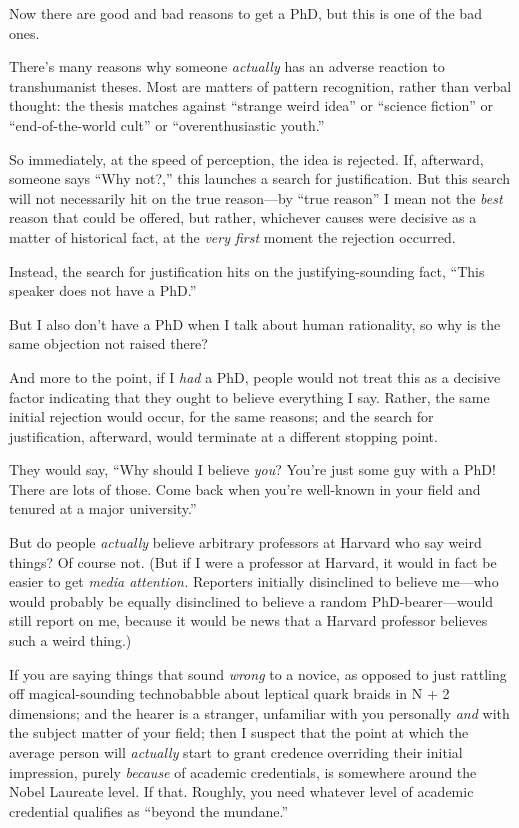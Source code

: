 {
 Now there are good and bad reasons to get a PhD, but this is one
of the bad ones.}

{
 There's many reasons why someone \textit{actually}
has an adverse reaction to transhumanist theses. Most are matters of
pattern recognition, rather than verbal thought: the thesis matches
against ``strange weird idea'' or
``science fiction'' or
``end-of-the-world cult'' or
``overenthusiastic youth.''}

{
 So immediately, at the speed of perception, the idea is rejected.
If, afterward, someone says ``Why
not?,'' this launches a search for justification. But
this search will not necessarily hit on the true reason---by
``true reason'' I mean not the
\textit{best} reason that could be offered, but rather, whichever
causes were decisive as a matter of historical fact, at the
\textit{very first} moment the rejection occurred.}

{
 Instead, the search for justification hits on the
justifying-sounding fact, ``This speaker does not have
a PhD.''}

{
 But I also don't have a PhD when I talk about
human rationality, so why is the same objection not raised there?}

{
 And more to the point, if I \textit{had} a PhD, people would not
treat this as a decisive factor indicating that they ought to believe
everything I say. Rather, the same initial rejection would occur, for
the same reasons; and the search for justification, afterward, would
terminate at a different stopping point.}

{
 They would say, ``Why should I believe
\textit{you}? You're just some guy with a PhD! There
are lots of those. Come back when you're well-known in
your field and tenured at a major university.''}

{
 But do people \textit{actually} believe arbitrary professors at
Harvard who say weird things? Of course not. (But if I were a professor
at Harvard, it would in fact be easier to get \textit{media attention.}
Reporters initially disinclined to believe me---who would probably be
equally disinclined to believe a random PhD-bearer---would still report
on me, because it would be news that a Harvard professor believes such
a weird thing.)}

{
 If you are saying things that sound \textit{wrong} to a novice, as
opposed to just rattling off magical-sounding technobabble about
leptical quark braids in N + 2 dimensions; and the hearer is a
stranger, unfamiliar with you personally \textit{and} with the subject
matter of your field; then I suspect that the point at which the
average person will \textit{actually} start to grant credence
overriding their initial impression, purely \textit{because} of
academic credentials, is somewhere around the Nobel Laureate level. If
that. Roughly, you need whatever level of academic credential qualifies
as ``beyond the mundane.''}

